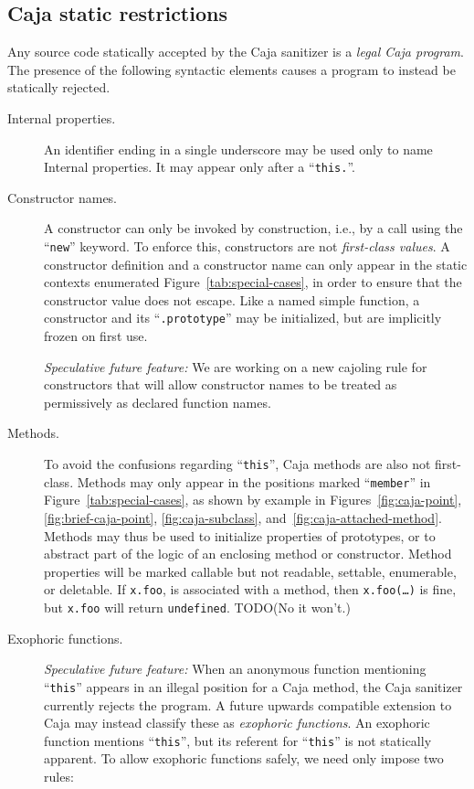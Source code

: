 \documentclass[letterpaper,twocolumn,10pt]{article}
\newcommand{\code}[1]{{\tt {#1}}}              %
\begin{document}
\subsection{Caja static restrictions}

Any source code statically accepted by the Caja sanitizer is a \emph{legal 
Caja program}. The presence of the following syntactic elements causes a 
program to instead be statically rejected.

\begin{description}

  \item[Internal properties.] An identifier ending in a single underscore may 
  be used only to name Internal properties. It may appear only after a 
  ``\code{this.}''.
  
  \item[Constructor names.] A constructor can only be invoked by 
  construction, i.e., by a call using the ``\code{new}'' keyword. To enforce 
  this, constructors are not \emph{first-class values}. A constructor 
  definition and a constructor name can only appear in the static contexts 
  enumerated Figure~\ref{tab:special-cases}, in order to ensure that the 
  constructor value does not escape. Like a named simple function, a 
  constructor and its ``\code{.prototype}'' may be initialized, but are 
  implicitly frozen on first use.
  
  \emph{Speculative future feature:} We are working on a new cajoling rule 
  for constructors that will allow constructor names to be treated as 
  permissively as declared function names.
  
  \item[Methods.] To avoid the confusions regarding ``\code{this}'', Caja 
  methods are also not first-class. Methods may only appear in the positions 
  marked ``\code{member}'' in Figure~\ref{tab:special-cases}, as shown by 
  example in Figures~\ref{fig:caja-point}, \ref{fig:brief-caja-point}, 
  \ref{fig:caja-subclass}, and~\ref{fig:caja-attached-method}. Methods may 
  thus be used to initialize properties of prototypes, or to abstract 
  part of the logic of an enclosing method or constructor. Method properties 
  will be marked callable but not readable, settable, enumerable, or 
  deletable. If \code{x.foo}, is associated with a method, then 
  \code{x.foo(\ldots)} is fine, but \code{x.foo} will return \code{undefined}. 
  TODO(No it won't.)

  \item[Exophoric functions.] \emph{Speculative future feature:} When an 
  anonymous function mentioning ``\code{this}'' appears in an illegal 
  position for a Caja method, the Caja sanitizer currently rejects the 
  program. A future upwards compatible extension to Caja may instead classify 
  these as \emph{exophoric functions}. An exophoric function mentions 
  ``\code{this}'', but its referent for ``\code{this}'' is not statically 
  apparent. To allow exophoric functions safely, we need only impose two 
  rules:
  

\end{description}
\end{document}
